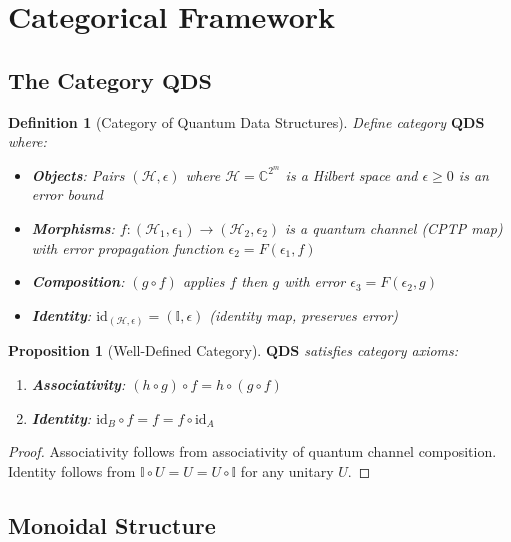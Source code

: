 \documentclass[11pt]{article}
\newtheorem{proposition}[theorem]{Proposition}
\newtheorem{definition}{Definition}
\begin{document}
\section{Categorical Framework}
\label{sec:category}

\subsection{The Category $\mathbf{QDS}$}

\begin{definition}[Category of Quantum Data Structures]
Define category $\mathbf{QDS}$ where:
\begin{itemize}
\item \textbf{Objects}: Pairs $(\mathcal{H}, \epsilon)$ where $\mathcal{H} = \mathbb{C}^{2^m}$ is a Hilbert space and $\epsilon \geq 0$ is an error bound
\item \textbf{Morphisms}: $f : (\mathcal{H}_1, \epsilon_1) \to (\mathcal{H}_2, \epsilon_2)$ is a quantum channel (CPTP map) with error propagation function $\epsilon_2 = F(\epsilon_1, f)$
\item \textbf{Composition}: $(g \circ f)$ applies $f$ then $g$ with error $\epsilon_3 = F(\epsilon_2, g)$
\item \textbf{Identity}: $\text{id}_{(\mathcal{H}, \epsilon)} = (\mathbb{I}, \epsilon)$ (identity map, preserves error)
\end{itemize}
\end{definition}

\begin{proposition}[Well-Defined Category]
\label{prop:well_defined}
$\mathbf{QDS}$ satisfies category axioms:
\begin{enumerate}
\item \textbf{Associativity}: $(h \circ g) \circ f = h \circ (g \circ f)$
\item \textbf{Identity}: $\text{id}_B \circ f = f = f \circ \text{id}_A$
\end{enumerate}
\end{proposition}

\begin{proof}
Associativity follows from associativity of quantum channel composition. Identity follows from $\mathbb{I} \circ U = U = U \circ \mathbb{I}$ for any unitary $U$.
\end{proof}

\subsection{Monoidal Structure}
\end{document}
